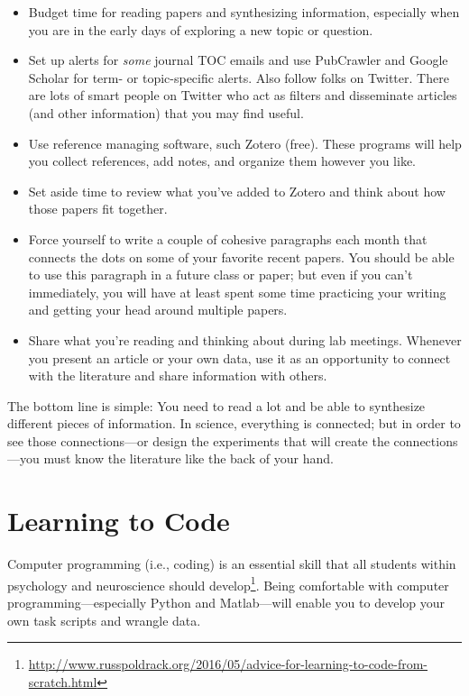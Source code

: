 \documentclass[letterpaper,11pt,oneside]{memoir}
\begin{document}
\begin{itemize}
\item Budget time for reading papers and synthesizing information, especially when you are in the early days of exploring a new topic or question. 
\item Set up alerts for \textit{some} journal TOC emails and use PubCrawler and Google Scholar for term- or topic-specific alerts. Also follow folks on Twitter. There are lots of smart people on Twitter who act as filters and disseminate articles (and other information) that you may find useful.
\item Use reference managing software, such Zotero (free). These programs will help you collect references, add notes, and organize them however you like. 
\item Set aside time to review what you've added to Zotero and think about how those papers fit together.
\item Force yourself to write a couple of cohesive paragraphs each month that connects the dots on some of your favorite recent papers. You should be able to use this paragraph in a future class or paper; but even if you can't immediately, you will have at least spent some time practicing your writing and getting your head around multiple papers.
\item Share what you're reading and thinking about during lab meetings. Whenever you present an article or your own data, use it as an opportunity to connect with the literature and share information with others. 
\end{itemize}

\begin{shaded}
\noindent The bottom line is simple: You need to read a lot and be able to synthesize different pieces of information. In science, everything is connected; but in order to see those connections---or design the experiments that will create the connections---you must know the literature like the back of your hand.
\end{shaded}


\section{Learning to Code}
\label{sec:coding}

Computer programming (i.e., coding) is an essential skill that all students within psychology and neuroscience should develop\footnote{\url{http://www.russpoldrack.org/2016/05/advice-for-learning-to-code-from-scratch.html}}. Being comfortable with computer programming---especially Python and Matlab---will enable you to develop your own task scripts and wrangle data. 
\end{document}
